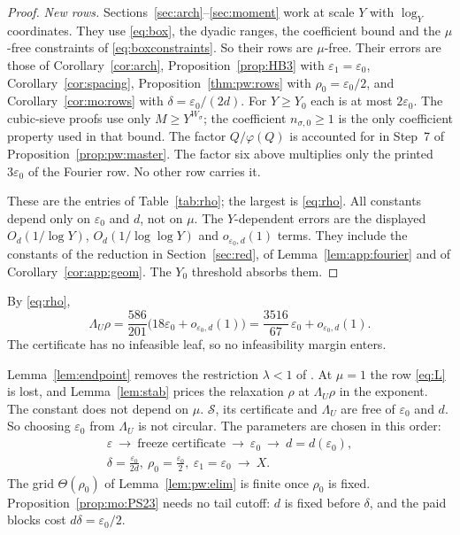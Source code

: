 \documentclass{amsart}
\theoremstyle{definition}
\theoremstyle{plain}
\numberwithin{equation}{section}
\numberwithin{table}{section}
\newcommand{\certLambdaFrac}{\frac{586}{201}}
\newcommand{\certLambdaRho}{\frac{3516}{67}}
\begin{document}
\begin{proof}
\emph{New rows.} Sections~\ref{sec:arch}--\ref{sec:moment} work at scale $Y$
with $\log_Y$ coordinates. They use \eqref{eq:box}, the dyadic ranges, the
coefficient bound and the $\mu$-free constraints of
\eqref{eq:boxconstraints}. So their rows are $\mu$-free. Their errors are
those of Corollary~\ref{cor:arch}, Proposition~\ref{prop:HB3} with
$\varepsilon_1=\varepsilon_0$, Corollary~\ref{cor:spacing},
Proposition~\ref{thm:pw:rows} with $\rho_0=\varepsilon_0/2$, and
Corollary~\ref{cor:mo:rows} with $\delta=\varepsilon_0/(2d)$. For
$Y\ge Y_0$ each is at most $2\varepsilon_0$. The cubic-sieve proofs use only
$M\ge Y^{W_\sigma}$; the coefficient $n_{\sigma,0}\ge1$ is the only
coefficient property used in that bound. The factor $Q/\varphi(Q)$ is
accounted for in Step~7 of Proposition~\ref{prop:pw:master}. The factor six above multiplies
only the printed $3\varepsilon_0$ of the Fourier row. No other row carries it.

These are the entries of Table~\ref{tab:rho}; the largest is \eqref{eq:rho}.
All constants depend only on $\varepsilon_0$ and $d$, not on $\mu$. The
$Y$-dependent errors are the displayed $O_d(1/\log Y)$,
$O_d(1/\log\log Y)$ and $o_{\varepsilon_0,d}(1)$ terms. They include the
constants of the reduction in Section~\ref{sec:red}, of
Lemma~\ref{lem:app:fourier} and of Corollary~\ref{cor:app:geom}.
The $Y_0$ threshold absorbs them.
\end{proof}

By \eqref{eq:rho},
\begin{equation}\label{eq:Lambdarho}
 \Lambda_U\rho=\certLambdaFrac\bigl(18\varepsilon_0+o_{\varepsilon_0,d}(1)\bigr)
 =\certLambdaRho\,\varepsilon_0+o_{\varepsilon_0,d}(1).
\end{equation}
The certificate has no infeasible leaf, so no infeasibility margin enters.

Lemma~\ref{lem:endpoint} removes the restriction $\lambda<1$ of
\cite[Theorem~1.3]{BBLT}. At $\mu=1$ the row \eqref{eq:L} is lost, and
Lemma~\ref{lem:stab} prices the relaxation $\rho$ at $\Lambda_U\rho$ in the
exponent. The constant does not depend on $\mu$. $\mathcal S$, its
certificate and $\Lambda_U$ are free of $\varepsilon_0$ and $d$. So choosing
$\varepsilon_0$ from $\Lambda_U$ is not circular. The parameters are chosen
in this order:
\[
 \begin{gathered}
 \varepsilon\ \longrightarrow\ \text{freeze certificate}\ \longrightarrow\ \varepsilon_0
 \ \longrightarrow\ d=d(\varepsilon_0),\\
 \delta=\frac{\varepsilon_0}{2d},\ \rho_0=\frac{\varepsilon_0}2,
 \ \varepsilon_1=\varepsilon_0\ \longrightarrow\ X.
 \end{gathered}
\]
The grid $\Theta(\rho_0)$ of Lemma~\ref{lem:pw:elim} is finite once $\rho_0$
is fixed. Proposition~\ref{prop:mo:PS23} needs no tail cutoff: $d$ is fixed
before $\delta$, and the paid blocks cost $d\delta=\varepsilon_0/2$.
\end{document}
